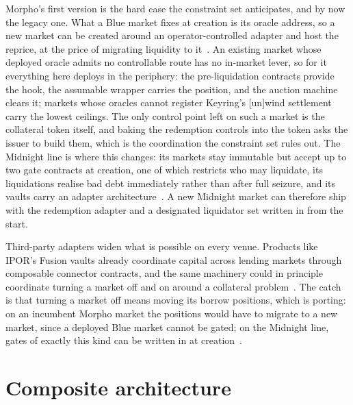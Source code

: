 \documentclass[11pt,a4paper]{article}
\begin{document}
Morpho's first version is the hard case the constraint set anticipates, and by now the legacy one. What a Blue market fixes at creation is its oracle address, so a new market can be created around an operator-controlled adapter and host the reprice, at the price of migrating liquidity to it~\cite{morpho}. An existing market whose deployed oracle admits no controllable route has no in-market lever, so for it everything here deploys in the periphery: the pre-liquidation contracts provide the hook, the assumable wrapper carries the position, and the auction machine clears it; markets whose oracles cannot register Keyring's [un]wind settlement carry the lowest ceilings. The only control point left on such a market is the collateral token itself, and baking the redemption controls into the token asks the issuer to build them, which is the coordination the constraint set rules out. The Midnight line is where this changes: its markets stay immutable but accept up to two gate contracts at creation, one of which restricts who may liquidate, its liquidations realise bad debt immediately rather than after full seizure, and its vaults carry an adapter architecture~\cite{midnight}. A new Midnight market can therefore ship with the redemption adapter and a designated liquidator set written in from the start.

Third-party adapters widen what is possible on every venue. Products like IPOR's Fusion vaults already coordinate capital across lending markets through composable connector contracts, and the same machinery could in principle coordinate turning a market off and on around a collateral problem~\cite{ipor}. The catch is that turning a market off means moving its borrow positions, which is porting: on an incumbent Morpho market the positions would have to migrate to a new market, since a deployed Blue market cannot be gated; on the Midnight line, gates of exactly this kind can be written in at creation~\cite{midnight}.

\section{Composite architecture}\label{sec:composite}
\end{document}
